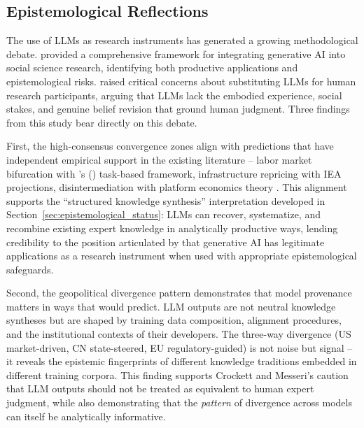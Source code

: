 \documentclass[preprint,review,12pt]{elsarticle}
\begin{document}
\subsection{Epistemological Reflections}
\label{sec:epistemological_reflections}

The use of LLMs as research instruments has generated a growing methodological debate. \citet{bail2024genaisocialscience} provided a comprehensive framework for integrating generative AI into social science research, identifying both productive applications and epistemological risks. \citet{crockett2024llmparticipants} raised critical concerns about substituting LLMs for human research participants, arguing that LLMs lack the embodied experience, social stakes, and genuine belief revision that ground human judgment. Three findings from this study bear directly on this debate.

First, the high-consensus convergence zones align with predictions that have independent empirical support in the existing literature -- labor market bifurcation with \citeauthor{acemoglu2019automation}'s (\citeyear{acemoglu2019automation}) task-based framework, infrastructure repricing with IEA projections, disintermediation with platform economics theory \citep{goldfarb2019digital}. This alignment supports the ``structured knowledge synthesis'' interpretation developed in Section~\ref{sec:epistemological_status}: LLMs can recover, systematize, and recombine existing expert knowledge in analytically productive ways, lending credibility to the position articulated by \citet{bail2024genaisocialscience} that generative AI has legitimate applications as a research instrument when used with appropriate epistemological safeguards.

Second, the geopolitical divergence pattern demonstrates that model provenance matters in ways that \citet{crockett2024llmparticipants} would predict. LLM outputs are not neutral knowledge syntheses but are shaped by training data composition, alignment procedures, and the institutional contexts of their developers. The three-way divergence (US market-driven, CN state-steered, EU regulatory-guided) is not noise but signal -- it reveals the epistemic fingerprints of different knowledge traditions embedded in different training corpora. This finding supports Crockett and Messeri's caution that LLM outputs should not be treated as equivalent to human expert judgment, while also demonstrating that the \textit{pattern} of divergence across models can itself be analytically informative.
\end{document}
